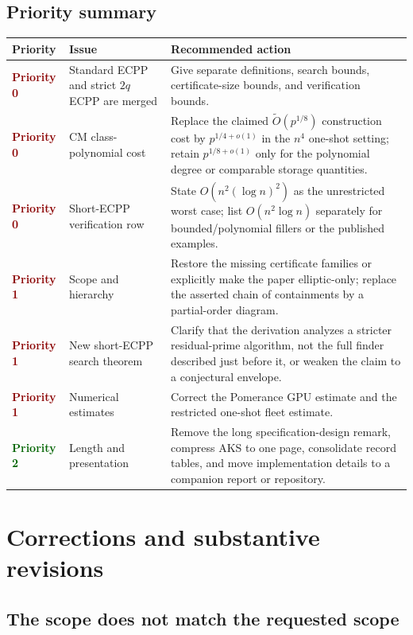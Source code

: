 \documentclass[11pt]{amsart}
\newcommand{\Ot}{\widetilde O}
\newcommand{\Pzero}{\textcolor{darkred}{\textbf{Priority 0}}}
\newcommand{\Pone}{\textcolor{darkred}{\textbf{Priority 1}}}
\newcommand{\Ptwo}{\textcolor{darkgreen}{\textbf{Priority 2}}}
\begin{document}
\subsection*{Priority summary}

\begin{center}
\small
\begin{tabularx}{\textwidth}{@{}p{}p{}X@{}}
\toprule
Priority & Issue & Recommended action\\
\midrule
\Pzero & Standard ECPP and strict $2q$ ECPP are merged & Give separate definitions, search bounds, certificate-size bounds, and verification bounds.\\
\Pzero & CM class-polynomial cost & Replace the claimed $\Ot(p^{1/8})$ construction cost by $p^{1/4+o(1)}$ in the $n^4$ one-shot setting; retain $p^{1/8+o(1)}$ only for the polynomial degree or comparable storage quantities.\\
\Pzero & Short-ECPP verification row & State $O(n^2(\log n)^2)$ as the unrestricted worst case; list $O(n^2\log n)$ separately for bounded/polynomial fillers or the published examples.\\
\Pone & Scope and hierarchy & Restore the missing certificate families or explicitly make the paper elliptic-only; replace the asserted chain of containments by a partial-order diagram.\\
\Pone & New short-ECPP search theorem & Clarify that the derivation analyzes a stricter residual-prime algorithm, not the full finder described just before it, or weaken the claim to a conjectural envelope.\\
\Pone & Numerical estimates & Correct the Pomerance GPU estimate and the restricted one-shot fleet estimate.\\
\Ptwo & Length and presentation & Remove the long specification-design remark, compress AKS to one page, consolidate record tables, and move implementation details to a companion report or repository.\\
\bottomrule
\end{tabularx}
\end{center}

\section{Corrections and substantive revisions}

\subsection{The scope does not match the requested scope}
\end{document}
